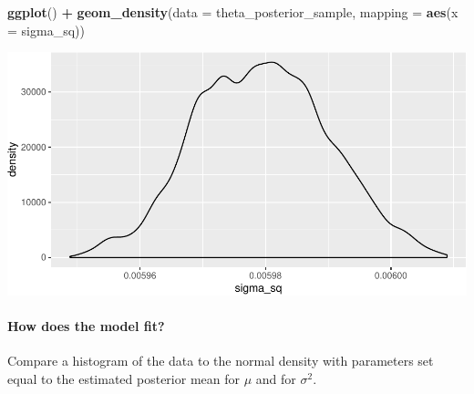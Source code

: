 \documentclass[]{article}
\newenvironment{Shaded}{\begin{snugshade}}{\end{snugshade}}
\newcommand{\KeywordTok}[1]{\textcolor[rgb]{0.13,0.29,0.53}{\textbf{#1}}}
\newcommand{\DataTypeTok}[1]{\textcolor[rgb]{0.13,0.29,0.53}{#1}}
\newcommand{\FloatTok}[1]{\textcolor[rgb]{0.00,0.00,0.81}{#1}}
\newcommand{\StringTok}[1]{\textcolor[rgb]{0.31,0.60,0.02}{#1}}
\newcommand{\OperatorTok}[1]{\textcolor[rgb]{0.81,0.36,0.00}{\textbf{#1}}}
\newcommand{\NormalTok}[1]{#1}
\let\oldparagraph\paragraph
\renewcommand{\paragraph}[1]{\oldparagraph{#1}\mbox{}}
\begin{document}
\begin{Shaded}
\begin{Highlighting}[]
\KeywordTok{ggplot}\NormalTok{() }\OperatorTok{+}
\StringTok{  }\KeywordTok{geom_density}\NormalTok{(}\DataTypeTok{data =}\NormalTok{ theta_posterior_sample, }\DataTypeTok{mapping =} \KeywordTok{aes}\NormalTok{(}\DataTypeTok{x =}\NormalTok{ sigma_sq))}
\end{Highlighting}
\end{Shaded}

\includegraphics{20190225_bayes_MCMC_Metropolis_files/figure-latex/unnamed-chunk-11-1.pdf}

\newpage

\paragraph{How does the model fit?}\label{how-does-the-model-fit}

Compare a histogram of the data to the normal density with parameters
set equal to the estimated posterior mean for \(\mu\) and for
\(\sigma^2\).

\begin{Shaded}
\end{Shaded}
\end{document}
